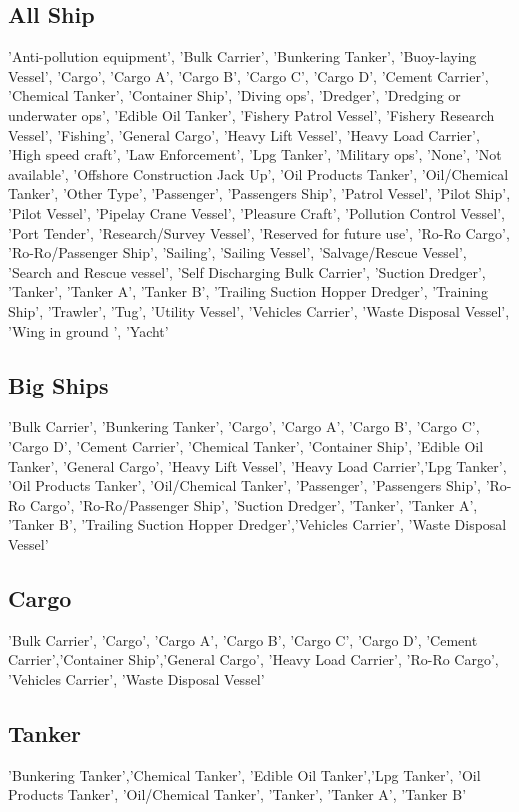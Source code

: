 \subsection{All Ship}
'Anti-pollution equipment', 'Bulk Carrier', 'Bunkering Tanker',
'Buoy-laying Vessel', 'Cargo', 'Cargo A', 'Cargo B', 'Cargo C',
'Cargo D', 'Cement Carrier', 'Chemical Tanker', 'Container Ship',
'Diving ops', 'Dredger', 'Dredging or underwater ops',
'Edible Oil Tanker', 'Fishery Patrol Vessel',
'Fishery Research Vessel', 'Fishing', 'General Cargo',
'Heavy Lift Vessel', 'Heavy Load Carrier', 'High speed craft',
'Law Enforcement', 'Lpg Tanker', 'Military ops', 'None',
'Not available', 'Offshore Construction Jack Up',
'Oil Products Tanker', 'Oil/Chemical Tanker', 'Other Type',
'Passenger', 'Passengers Ship', 'Patrol Vessel', 'Pilot Ship',
'Pilot Vessel', 'Pipelay Crane Vessel', 'Pleasure Craft',
'Pollution Control Vessel', 'Port Tender',
'Research/Survey Vessel', 'Reserved for future use', 'Ro-Ro Cargo',
'Ro-Ro/Passenger Ship', 'Sailing', 'Sailing Vessel',
'Salvage/Rescue Vessel', 'Search and Rescue vessel',
'Self Discharging Bulk Carrier', 'Suction Dredger', 'Tanker',
'Tanker A', 'Tanker B', 'Trailing Suction Hopper Dredger',
'Training Ship', 'Trawler', 'Tug', 'Utility Vessel',
'Vehicles Carrier', 'Waste Disposal Vessel', 'Wing in ground ',
'Yacht'

\subsection{Big Ships}

'Bulk Carrier', 'Bunkering Tanker',
'Cargo', 'Cargo A', 'Cargo B', 'Cargo C',
'Cargo D', 'Cement Carrier', 'Chemical Tanker', 'Container Ship',
'Edible Oil Tanker', 'General Cargo',
'Heavy Lift Vessel', 'Heavy Load Carrier','Lpg Tanker', 
'Oil Products Tanker', 'Oil/Chemical Tanker', 'Passenger', 'Passengers Ship', 'Ro-Ro Cargo',
'Ro-Ro/Passenger Ship', 'Suction Dredger', 'Tanker',
'Tanker A', 'Tanker B', 'Trailing Suction Hopper Dredger','Vehicles Carrier', 'Waste Disposal Vessel'


\subsection{Cargo}

'Bulk Carrier', 'Cargo', 'Cargo A', 'Cargo B', 'Cargo C',
'Cargo D', 'Cement Carrier','Container Ship','General Cargo', 'Heavy Load Carrier',
'Ro-Ro Cargo', 'Vehicles Carrier', 'Waste Disposal Vessel'
       
      
\subsection{Tanker}
'Bunkering Tanker','Chemical Tanker', 
'Edible Oil Tanker','Lpg Tanker', 
'Oil Products Tanker', 'Oil/Chemical Tanker', 'Tanker',
'Tanker A', 'Tanker B'